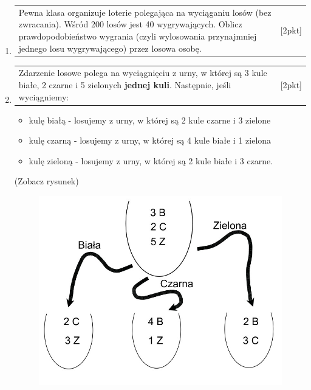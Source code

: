 \documentclass[12pt,a4paper]{article}
\begin{document}
\begin{enumerate}[1.]
		
		
		\item \begin{tabular}{p{13cm} r}
			Pewna klasa organizuje loterie polegająca na wyciąganiu losów (bez zwracania). Wśród 200 losów jest 40 wygrywających. Oblicz prawdopodobieństwo wygrania (czyli wylosowania przynajmniej jednego losu wygrywającego) przez losowa osobę.	  &[2pkt]\\ 
		\end{tabular}
		
		\item \begin{tabular}{p{13cm} r}
			Zdarzenie losowe polega na wyciągnięciu z urny, w której są 3 kule białe, 2 czarne i 5 zielonych \textbf{jednej kuli}. Następnie, jeśli wyciągniemy:	  &[2pkt]\\ 
		\end{tabular}
		
		\begin{itemize}
			\item kulę białą - losujemy z urny, w której są 2 kule czarne i 3 zielone
			\item kulę czarną - losujemy z urny, w której są 4 kule białe i 1 zielona
			\item kulę zieloną - losujemy z urny, w której są 2 kule białe i 3 czarne.
		\end{itemize}
		(Zobacz rysunek)
		
		\begin{figure}[h]
			\centering
			\includegraphics[scale=0.4]{rpt1.jpeg}
		\end{figure}
		

\end{enumerate}
\end{document}
